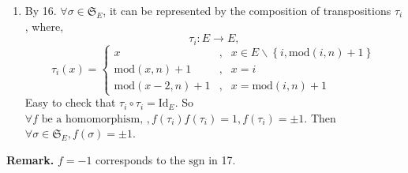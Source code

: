 \documentclass[12pt]{article}
\begin{document}
\begin{enumerate}
    \item By 16. $\forall \sigma \in \mathfrak{S}_E$, it can be represented by the composition of transpositions $\tau_i$, where,
        $$\tau_i: E\longrightarrow E,$$$$ \tau_i(x)=
        \left\{\begin{matrix}
        x&,&x\in E\backslash \left \{ i,\mathrm{mod} (i ,n)+1\right \} \\
        \mathrm{mod}(x,n)+1&,&x=i \\
        \mathrm{mod}( x-2,n)+1&,&x=\mathrm{mod}(i,n)+1
        \end{matrix}\right.$$
        Easy to check that $\tau_i\circ\tau_i=\mathrm{Id}_E$. So $\forall f \text{ be a homomorphism, },f(\tau_i)f(\tau_i)=1,f(\tau_i)=\pm 1$. Then $\forall \sigma \in \mathfrak{S}_E, f(\sigma)=\pm1$.
\end{enumerate}
\textbf{Remark.  }$f=-1$ corresponds to the $\mathrm{sgn}$ in 17.
\end{document}

